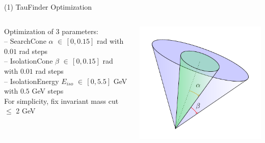 \documentclass[10pt]{beamer}
\begin{document}
\begin{frame}{(1) TauFinder Optimization}
\begin{columns}
\begin{column}{0.5\textwidth}
Optimization of 3 parameters:\\
\scriptsize
-- SearchCone $\alpha$  $\in \, [0,0.15] $ rad with $0.01 $ rad steps\\
-- IsolationCone $\beta$ $\in \, [0,0.15] $ rad with $0.01 $ rad steps\\
-- IsolationEnergy $E_{iso}$ $\in \, [0,5.5] $ GeV with $0.5 $ GeV steps \\

For simplicity, fix invariant mass cut $\leq$ 2 GeV
\end{column}
\begin{column}{0.5\textwidth}
\includegraphics[scale=0.6]{cone.pdf}
\end{column}
\end{columns}


\end{frame}
\end{document}
